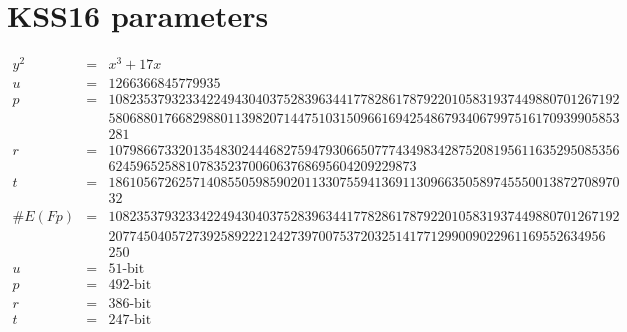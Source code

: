 \section{KSS16 parameters}
\label{appendix:KSS16}
\begin{eqnarray}
y^2 & = & x^3 + 17x \nonumber \\ 
u & = & 1266366845779935 \nonumber \\ 
p & = & 1082353793233422494304037528396344177828617879220105831937449880701267192 \nonumber \\ 
& &  5806880176682988011398207144751031509661694254867934067997516170939905853\nonumber \\
& & 281\nonumber \\
r & = &  1079866733201354830244468275947930665077743498342875208195611635295085356\nonumber \\
& &  62459652588107835237006063768695604209229873\nonumber \\
t & = &  1861056726257140855059859020113307559413691130966350589745550013872708970\nonumber \\
& & 32\nonumber \\
\#E(Fp) & = &  1082353793233422494304037528396344177828617879220105831937449880701267192\nonumber \\
& &  20774504057273925892221242739700753720325141771299009022961169552634956\nonumber \\
&& 250 \nonumber \\
u & = & 51\text{-bit} \nonumber \\
p & = & 492\text{-bit} \nonumber \\
r &  = & 386\text{-bit} \nonumber \\
t & = & 247\text{-bit} \nonumber
\end{eqnarray}